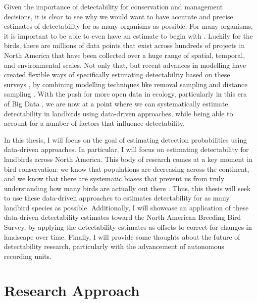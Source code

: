 \par Given the importance of detectability for conservation and management decisions, it is clear to see why we would want to have accurate and precise estimates of detectability for as many organisms as possible.
For many organisms, it is important to be able to even have an estimate to begin with \citep{bennett_how_2024}.
Luckily for the birds, there are millions of data points that exist across hundreds of projects in North America that have been collected over a huge range of spatial, temporal, and environmental scales.
Not only that, but recent advances in modelling have created flexible ways of specifically estimating detectability based on these surveys \citep{solymos_calibrating_2013}, by combining modelling techniques like removal sampling \citep{alldredge_time--detection_2007, farnsworth_removal_2002} and distance sampling \citep{buckland_introduction_2001, buckland_distance_2015}.
With the push for more open data in ecology, particularly in this era of Big Data \citep{binley_minimizing_2023}, we are now at a point where we can systematically estimate detectability in landbirds using data-driven approaches, while being able to account for a number of factors that influence detectability.

\par In this thesis, I will focus on the goal of estimating detection probabilities using data-driven approaches.
In particular, I will focus on estimating detectability for landbirds across North America.
This body of research comes at a key moment in bird conservation: we know that populations are decreasing across the continent, and we know that there are systematic biases that prevent us from truly understanding how many birds are actually out there \citep{stanton_estimating_2019, solymos_calibrating_2013, solymos_lessons_2020}.
Thus, this thesis will seek to use these data-driven approaches to estimates detectability for as many landbird species as possible.
Additionally, I will showcase an application of these data-driven detectability estimates toward the North American Breeding Bird Survey, by applying the detectability estimates as offsets to correct for changes in landscape over time.
Finally, I will provide some thoughts about the future of detectability research, particularly with the advancement of autonomous recording units.

\section{Research Approach}

